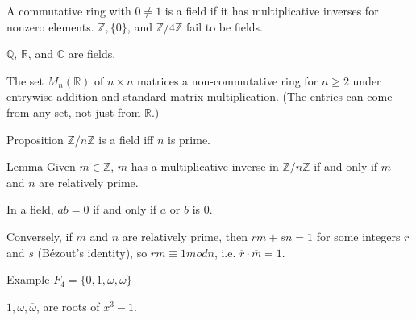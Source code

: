 \documentclass[12pt]{article}
\newcommand{\Z}{\ensuremath{\mathbb{Z}}}
\newcommand{\Q}{\ensuremath{\mathbb{Q}}}
\newcommand{\R}{\ensuremath{\mathbb{R}}}
\newcommand{\C}{\ensuremath{\mathbb{C}}}
\begin{document}
A commutative ring with $0 \neq 1$ is a field if it has multiplicative inverses for nonzero elements. $\Z, \{ 0 \}$, and $\Z/4\Z$ fail to be fields.

$\Q$, $\R$, and $\C$ are fields.

The set $M_n(\R)$ of $n \times n$ matrices a non-commutative ring for $n \geq 2$ under entrywise addition and standard matrix multiplication. (The entries can come from any set, not just from $\R$.)

Proposition $\Z/n\Z$ is a field iff $n$ is prime.

Lemma Given $m \in \Z$, $\overline{m}$ has a multiplicative inverse in $\Z/n\Z$ if and only if $m$ and $n$ are relatively prime.

In a field, $ab = 0$ if and only if $a$ or $b$ is 0.

Conversely, if $m$ and $n$ are relatively prime, then $rm + sn = 1$ for some integers $r$ and $s$ (Bézout's identity), so $rm \equiv 1 mod n$, i.e. $\overline{r} \cdot \overline{m} = 1$.

Example $F_4 = \{ 0, 1, \omega, \overline{\omega} \}$

$1, \omega, \overline{\omega}$, are roots of $x^3 - 1$.
\end{document}
